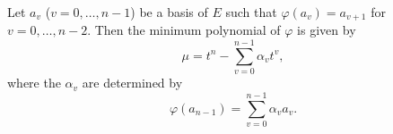 Let $a_v$ ($v = 0, \ldots, n-1$) be a basis of $E$ such that $\varphi(a_v) = a_{v+1}$ for $v = 0, \ldots, n-2$. Then the minimum polynomial of $\varphi$ is given by
$$\mu = t^n - \sum_{v=0}^{n-1} \alpha_v t^v,$$
where the $\alpha_v$ are determined by
$$\varphi(a_{n-1}) = \sum_{v=0}^{n-1} \alpha_v a_v.$$
